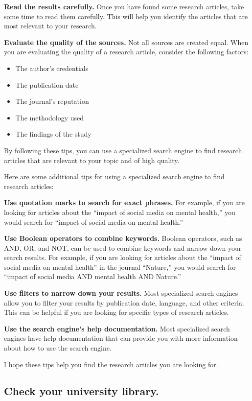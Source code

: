 \documentclass[
]{book}
\begin{document}
\textbf{Read the results carefully.} Once you have found some research articles, take some time to read them carefully. This will help you identify the articles that are most relevant to your research.

\textbf{Evaluate the quality of the sources.} Not all sources are created equal. When you are evaluating the quality of a research article, consider the following factors:

\begin{itemize}
\item
  The author's credentials
\item
  The publication date
\item
  The journal's reputation
\item
  The methodology used
\item
  The findings of the study
\end{itemize}

By following these tips, you can use a specialized search engine to find research articles that are relevant to your topic and of high quality.

Here are some additional tips for using a specialized search engine to find research articles:

\textbf{Use quotation marks to search for exact phrases.} For example, if you are looking for articles about the ``impact of social media on mental health,'' you would search for ``impact of social media on mental health.''

\textbf{Use Boolean operators to combine keywords.} Boolean operators, such as AND, OR, and NOT, can be used to combine keywords and narrow down your search results. For example, if you are looking for articles about the ``impact of social media on mental health'' in the journal ``Nature,'' you would search for ``impact of social media AND mental health AND Nature.''

\textbf{Use filters to narrow down your results.} Most specialized search engines allow you to filter your results by publication date, language, and other criteria. This can be helpful if you are looking for specific types of research articles.

\textbf{Use the search engine's help documentation.} Most specialized search engines have help documentation that can provide you with more information about how to use the search engine.

I hope these tips help you find the research articles you are looking for.

\hypertarget{check-your-university-library.}{%
\subsection*{Check your university library.}\label{check-your-university-library.}}
\end{document}
